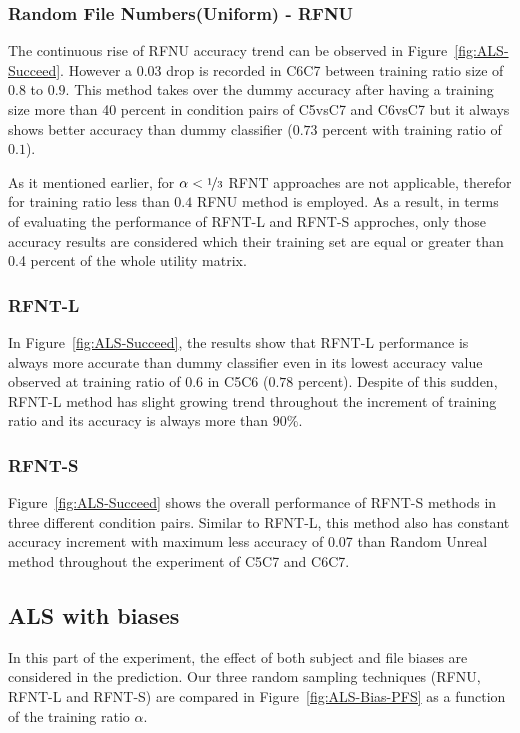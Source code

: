 \documentclass[10pt, conference, compsocconf]{IEEEtran}
\begin{document}
\subsubsection{Random File Numbers(Uniform) - RFNU}
The continuous rise of RFNU accuracy trend can be observed in Figure~\ref{fig:ALS-Succeed}.
However a 0.03 drop is recorded in C6C7 between training ratio size of $0.8$ to $0.9$. 
This method takes over the dummy accuracy after having a training size more than 40 percent 
in condition pairs of C5vsC7 and C6vsC7 but it always shows better accuracy than 
dummy classifier ($0.73$ percent with training ratio of $0.1$).\newline

\indent As it mentioned earlier, for $\alpha < \nicefrac{1}{3}$ RFNT approaches are not applicable, 
therefor for training ratio less than $0.4$ RFNU method is employed. As a result, in terms of 
evaluating the performance of RFNT-L and RFNT-S approches, only those accuracy results are 
considered which their training set are equal or greater than 0.4 percent of the whole utility matrix.\newline 

\subsubsection{RFNT-L}

In Figure~\ref{fig:ALS-Succeed}, the results show that RFNT-L performance is always more accurate than
dummy classifier even in its lowest accuracy value observed at training ratio of $0.6$ in C5C6 ($0.78$ percent).
Despite of this sudden, RFNT-L method has slight growing trend throughout the 
increment of training ratio and its accuracy is always more than $90\%$. 

\subsubsection{RFNT-S}
Figure~\ref{fig:ALS-Succeed} shows the overall performance of RFNT-S methods in three different condition pairs.
Similar to RFNT-L, this method also has constant accuracy increment with maximum less accuracy of 0.07 than 
Random Unreal method throughout the experiment of C5C7 and C6C7.

\subsection{ALS with biases}
In this part of the experiment, the effect of both subject and file 
biases are considered in the prediction. Our three random sampling 
techniques (RFNU, RFNT-L and RFNT-S) are compared in 
Figure~\ref{fig:ALS-Bias-PFS} as a function of the training 
ratio $\alpha$.
\end{document}
